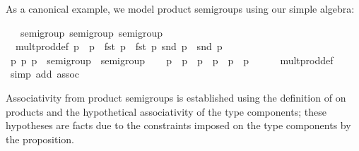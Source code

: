 \begin{isabellebody}
\begin{isamarkuptext}
  As a canonical example, we model product semigroups
  using our simple algebra:%
\end{isamarkuptext}%
\isamarkuptrue%
%
\isadelimquote
%
\endisadelimquote
%
\isatagquote
{}\isamarkupfalse%
\ {\isacharasterisk}\ {\isacharcolon}{\isacharcolon}\ {\isacharparenleft}semigroup{\isacharcomma}\ semigroup{\isacharparenright}\ semigroup\isanewline
{}\isanewline
\isanewline
{}\isamarkupfalse%
\isanewline
\ \ mult{\isacharunderscore}prod{\isacharunderscore}def{\isacharcolon}\ {\isachardoublequoteopen}p\ {\isasymotimes}\ p\ {\isacharequal}\ {\isacharparenleft}fst\ p\ {\isasymotimes}\ fst\ p\ snd\ p\ {\isasymotimes}\ snd\ p\isanewline
\isanewline
{}\isamarkupfalse%
\ \isamarkupfalse%
\isanewline
\ \ \isamarkupfalse%
\ p\ p\ p\ {\isacharcolon}{\isacharcolon}\ {\isachardoublequoteopen}{\isasymalpha}{\isasymColon}semigroup\ {\isasymtimes}\ {\isasymbeta}{\isasymColon}semigroup{\isachardoublequoteclose}\isanewline
\ \ \isamarkupfalse%
\ {\isachardoublequoteopen}p\ {\isasymotimes}\ p\ {\isasymotimes}\ p\ {\isacharequal}\ p\ {\isasymotimes}\ {\isacharparenleft}p\ {\isasymotimes}\ p\isanewline
\ \ \ \ \isamarkupfalse%
\ mult{\isacharunderscore}prod{\isacharunderscore}def\ \isamarkupfalse%
\ {\isacharparenleft}simp\ add{\isacharcolon}\ assoc{\isacharparenright}\isanewline
{}\isamarkupfalse%
\ \ \ \ \ \ \isanewline
\isanewline
{}\isamarkupfalse%
%
\endisatagquote
{\isafoldquote}%
%
\isadelimquote
%
\endisadelimquote
%
\begin{isamarkuptext}%
\noindent Associativity from product semigroups is
  established using
  the definition of \isa{{\isacharparenleft}{\isasymotimes}{\isacharparenright}} on products and the hypothetical
  associativity of the type components;  these hypotheses
  are facts due to the  constraints imposed
  on the type components by the \hyperlink{command.instance}{\mbox{}} proposition.

\end{isamarkuptext}
\end{isabellebody}
